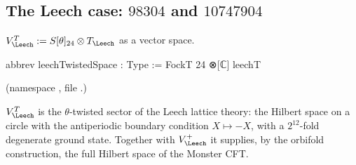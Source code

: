 \subsection{The Leech case: \texorpdfstring{$98304$}{98304} and \texorpdfstring{$10747904$}{10747904}}

\begin{definition}
$V_\Leech^T := S[\theta]_{24}\otimes T_\Leech$ as a vector space.
\end{definition}
\begin{leancode}
abbrev leechTwistedSpace : Type := FockT 24 ⊗[ℂ] leechT
\end{leancode}
(namespace , file .)

\begin{physics}
$V_\Leech^T$ is the $\theta$-twisted sector of the Leech lattice theory: the Hilbert space on a circle with the antiperiodic boundary condition $X\mapsto-X$, with a $2^{12}$-fold degenerate ground state. Together with $V_\Leech^+$ it supplies, by the orbifold construction, the full Hilbert space of the Monster CFT.
\end{physics}

